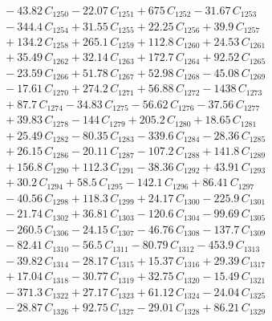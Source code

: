 \documentclass[a4paper,11pt]{article}
\begin{document}
\begin{align}
&\quad - 43.82\,C_{1250} - 22.07\,C_{1251} + 675\,C_{1252} - 31.67\,C_{1253} \nonumber\\
&\quad - 344.4\,C_{1254} + 31.55\,C_{1255} + 22.25\,C_{1256} + 39.9\,C_{1257} \nonumber\\
&\quad + 134.2\,C_{1258} + 265.1\,C_{1259} + 112.8\,C_{1260} + 24.53\,C_{1261} \nonumber\\
&\quad + 35.49\,C_{1262} + 32.14\,C_{1263} + 172.7\,C_{1264} + 92.52\,C_{1265} \nonumber\\
&\quad - 23.59\,C_{1266} + 51.78\,C_{1267} + 52.98\,C_{1268} - 45.08\,C_{1269} \nonumber\\
&\quad - 17.61\,C_{1270} + 274.2\,C_{1271} + 56.88\,C_{1272} - 1438\,C_{1273} \nonumber\\
&\quad + 87.7\,C_{1274} - 34.83\,C_{1275} - 56.62\,C_{1276} - 37.56\,C_{1277} \nonumber\\
&\quad + 39.83\,C_{1278} - 144\,C_{1279} + 205.2\,C_{1280} + 18.65\,C_{1281} \nonumber\\
&\quad + 25.49\,C_{1282} - 80.35\,C_{1283} - 339.6\,C_{1284} - 28.36\,C_{1285} \nonumber\\
&\quad + 26.15\,C_{1286} - 20.11\,C_{1287} - 107.2\,C_{1288} + 141.8\,C_{1289} \nonumber\\
&\quad + 156.8\,C_{1290} + 112.3\,C_{1291} - 38.36\,C_{1292} + 43.91\,C_{1293} \nonumber\\
&\quad + 30.2\,C_{1294} + 58.5\,C_{1295} - 142.1\,C_{1296} + 86.41\,C_{1297} \nonumber\\
&\quad - 40.56\,C_{1298} + 118.3\,C_{1299} + 24.17\,C_{1300} - 225.9\,C_{1301} \nonumber\\
&\quad - 21.74\,C_{1302} + 36.81\,C_{1303} - 120.6\,C_{1304} - 99.69\,C_{1305} \nonumber\\
&\quad - 260.5\,C_{1306} - 24.15\,C_{1307} - 46.76\,C_{1308} - 137.7\,C_{1309} \nonumber\\
&\quad - 82.41\,C_{1310} - 56.5\,C_{1311} - 80.79\,C_{1312} - 453.9\,C_{1313} \nonumber\\
&\quad - 39.82\,C_{1314} - 28.17\,C_{1315} + 15.37\,C_{1316} + 29.39\,C_{1317} \nonumber\\
&\quad + 17.04\,C_{1318} - 30.77\,C_{1319} + 32.75\,C_{1320} - 15.49\,C_{1321} \nonumber\\
&\quad - 371.3\,C_{1322} + 27.17\,C_{1323} + 61.12\,C_{1324} - 24.04\,C_{1325} \nonumber\\
&\quad - 28.87\,C_{1326} + 92.75\,C_{1327} - 29.01\,C_{1328} + 86.21\,C_{1329} \nonumber\\

\end{align}
\end{document}
